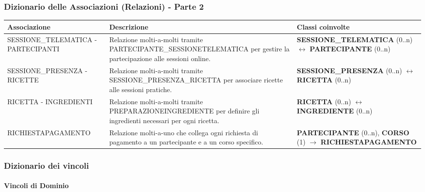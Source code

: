 \subsubsection{Dizionario delle Associazioni (Relazioni) - Parte 2}
\begin{center}
\begin{tcolorbox}[colback=white!98!gray, colframe=myblue!80!black, title=Dizionario delle Associazioni (Relazioni) - Parte 2, arc=4mm, boxrule=0.8pt, width=0.98\textwidth]
\renewcommand{\arraystretch}{1.2}
\begin{tabularx}{\textwidth}{p{3.8cm}p{4.2cm}X}
\textbf{Associazione} & \textbf{Descrizione} & \textbf{Classi coinvolte} \\
\hline
SESSIONE\_TELEMATICA\- - PARTECI\-PANTI & Relazione molti-a-molti tramite PARTECIPANTE\_\-SESSIONETE\-LEMATICA per gestire la partecipazione alle sessioni online. & \textbf{SESSIONE\_\-TELEMATICA} (0..n) $\leftrightarrow$ \textbf{PARTECIPANTE} (0..n) \\
\hline
SESSIONE\_\-PRESENZA - RICETTE & Relazione molti-a-molti tramite SESSIONE\_\-PRESENZA\_\-RICETTA per associare ricette alle sessioni pratiche. & \textbf{SESSIONE\_\-PRESENZA} (0..n) $\leftrightarrow$ \textbf{RICETTA} (0..n) \\
\hline
RICETTA - INGREDIENTI & Relazione molti-a-molti tramite PREPARAZIONE\-INGREDIENTE per definire gli ingredienti necessari per ogni ricetta. & \textbf{RICETTA} (0..n) $\leftrightarrow$ \textbf{INGREDIENTE} (0..n) \\
\hline
RICHIESTA\-PAGAMENTO & Relazione molti-a-uno che collega ogni richiesta di pagamento a un partecipante e a un corso specifico. & \textbf{PARTECIPANTE} (0..n), \textbf{CORSO} (1) $\rightarrow$ \textbf{RICHIESTAPAGAMENTO} \\
\hline
\end{tabularx}
\end{tcolorbox}
\end{center}

\subsubsection{Dizionario dei vincoli }

\paragraph{Vincoli di Dominio}

